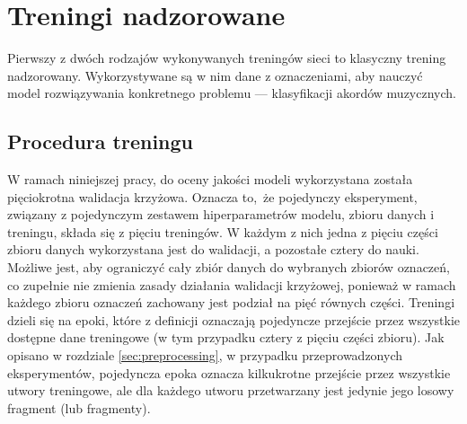 \section{Treningi nadzorowane}

Pierwszy z dwóch rodzajów wykonywanych treningów sieci to klasyczny trening nadzorowany.  Wykorzystywane są w nim dane z oznaczeniami, aby nauczyć model rozwiązywania konkretnego problemu --- klasyfikacji akordów muzycznych. 


\subsection{Procedura treningu}

W ramach niniejszej pracy, do oceny jakości modeli wykorzystana została pięciokrotna walidacja krzyżowa. Oznacza to, że pojedynczy eksperyment, związany z pojedynczym zestawem hiperparametrów modelu, zbioru danych i treningu, składa się z pięciu treningów. W każdym z nich jedna z pięciu części zbioru danych wykorzystana jest do walidacji, a pozostałe cztery do nauki. Możliwe jest, aby ograniczyć cały zbiór danych do wybranych zbiorów oznaczeń, co zupełnie nie zmienia zasady działania walidacji krzyżowej, ponieważ w ramach każdego zbioru oznaczeń zachowany jest podział na pięć równych części. Treningi dzieli się na epoki, które z definicji oznaczają pojedyncze przejście przez wszystkie dostępne dane treningowe (w tym przypadku cztery z pięciu części zbioru). Jak opisano w rozdziale \ref{sec:preprocessing}, w przypadku przeprowadzonych eksperymentów, pojedyncza epoka oznacza kilkukrotne przejście przez wszystkie utwory treningowe, ale dla każdego utworu przetwarzany jest jedynie jego losowy fragment (lub fragmenty).

